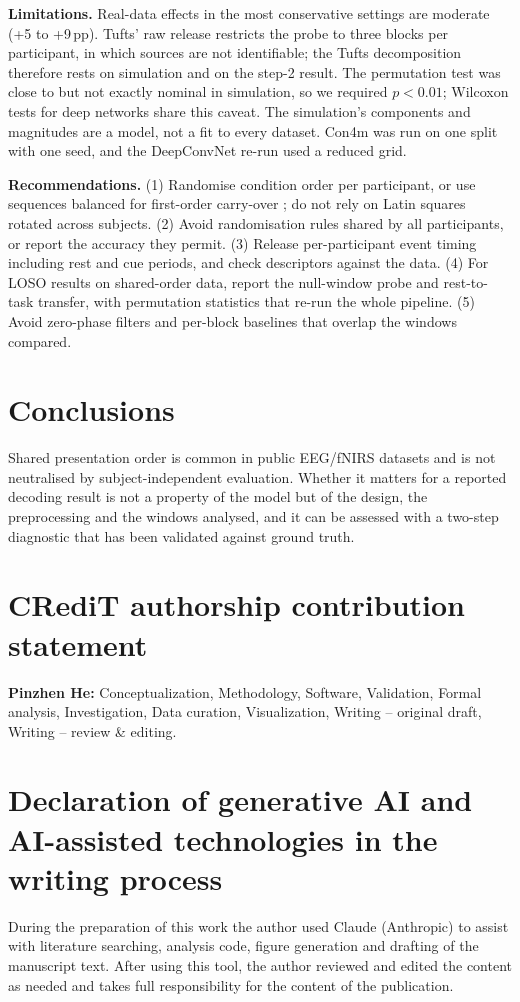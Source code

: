 \documentclass[preprint,11pt]{elsarticle}
\newcommand{\pp}{\,pp}
\begin{document}
\textbf{Limitations.} Real-data effects in the most conservative settings are moderate (+5 to +9\pp). Tufts' raw release restricts the probe to three blocks per participant, in which sources are not identifiable; the Tufts decomposition therefore rests on simulation and on the step-2 result. The permutation test was close to but not exactly nominal in simulation, so we required $p<0.01$; Wilcoxon tests for deep networks share this caveat. The simulation's components and magnitudes are a model, not a fit to every dataset. Con4m was run on one split with one seed, and the DeepConvNet re-run used a reduced grid.

\textbf{Recommendations.} (1) Randomise condition order per participant, or use sequences balanced for first-order carry-over \citep{williams1949}; do not rely on Latin squares rotated across subjects. (2) Avoid randomisation rules shared by all participants, or report the accuracy they permit. (3) Release per-participant event timing including rest and cue periods, and check descriptors against the data. (4) For LOSO results on shared-order data, report the null-window probe and rest-to-task transfer, with permutation statistics that re-run the whole pipeline. (5) Avoid zero-phase filters and per-block baselines that overlap the windows compared.

\section{Conclusions}
Shared presentation order is common in public EEG/fNIRS datasets and is not neutralised by subject-independent evaluation. Whether it matters for a reported decoding result is not a property of the model but of the design, the preprocessing and the windows analysed, and it can be assessed with a two-step diagnostic that has been validated against ground truth.

\section*{CRediT authorship contribution statement}
\textbf{Pinzhen He:} Conceptualization, Methodology, Software, Validation, Formal analysis, Investigation, Data curation, Visualization, Writing -- original draft, Writing -- review \& editing.

\section*{Declaration of generative AI and AI-assisted technologies in the writing process}
During the preparation of this work the author used Claude (Anthropic) to assist with literature searching, analysis code, figure generation and drafting of the manuscript text. After using this tool, the author reviewed and edited the content as needed and takes full responsibility for the content of the publication.
\end{document}
